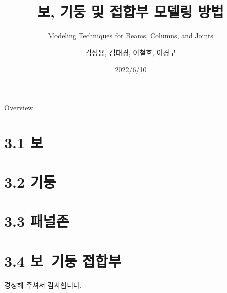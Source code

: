 \documentclass[serif,9pt]{beamer}
\title{보, 기둥 및 접합부 모델링 방법}
\subtitle{\small{Modeling Techniques for Beams, Columns, and Joints}}
\author{김성용\inst{1}, 김대경\inst{2}, 이철호\inst{3}, 이경구\inst{4}}
\institute[CWNU] %
{
	\inst{1}%
	조교수, 창원대학교 건축공학과 | \url{sungyong.kim@changwon.ac.kr}\and
	\inst{2}%
	조교수, 울산대학교 건축학부 \and
	\inst{3}%
	교수, 서울대학교 건축학과 \and
	\inst{4}
	교수, 단국대학교 건축학과
}
\date{2022/6/10}
\begin{document}
\begin{frame}
	\titlepage
\end{frame}

\begin{frame}{Overview}
\tableofcontents
\end{frame}

%

\section{3.1 보}	

	
\section{3.2 기둥}


\section{3.3 패널존}


\section{3.4 보--기둥 접합부}


	\begin{frame}
		경청해 주셔서 감사합니다. 
	\end{frame}
\end{document}
